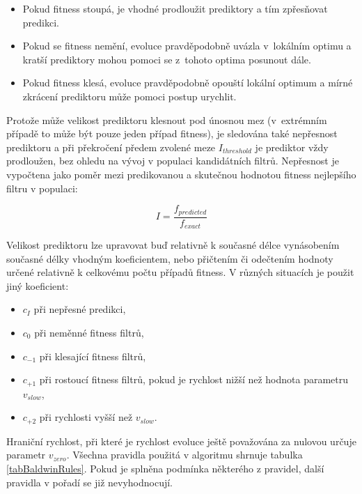 \begin{itemize}
    \item Pokud fitness stoupá, je vhodné prodloužit prediktory a tím zpřesňovat predikci.
    \item Pokud se fitness nemění, evoluce pravděpodobně uvázla v~lokálním optimu a kratší prediktory mohou pomoci se z~tohoto optima posunout dále.
    \item Pokud fitness klesá, evoluce pravděpodobně opouští lokální optimum a mírné zkrácení prediktoru může pomoci postup urychlit.
\end{itemize}

Protože může velikost prediktoru klesnout pod únosnou mez (v~extrémním případě to může být pouze jeden případ fitness), je sledována také nepřesnost prediktoru a při překročení předem zvolené meze $I_\mathit{threshold}$ je prediktor vždy prodloužen, bez ohledu na vývoj v populaci kandidátních filtrů. Nepřesnost je vypočtena jako poměr mezi predikovanou a skutečnou hodnotou fitness nejlepšího filtru v populaci:

\begin{equation}
    \mathit{I} = \frac{f_{\mathit{predicted}}}{f_{\mathit{exact}}}
\end{equation}

Velikost prediktoru lze upravovat buď relativně k současné délce vynásobením současné délky vhodným koeficientem, nebo přičtením či odečtením hodnoty určené relativně k celkovému počtu případů fitness. V různých situacích je použit jiný koeficient: %

\begin{itemize}
    \item $c_I$ při nepřesné predikci,
    \item $c_0$ při neměnné fitness filtrů,
    \item $c_{-1}$ při klesající fitness filtrů,
    \item $c_{+1}$ při rostoucí fitness filtrů, pokud je rychlost nižší než hodnota parametru $v_\mathit{slow}$,
    \item $c_{+2}$ při rychlosti vyšší než $v_\mathit{slow}$.
\end{itemize}

Hraniční rychlost, při které je rychlost evoluce ještě považována za nulovou určuje parametr $v_\mathit{zero}$. Všechna pravidla použitá v algoritmu shrnuje tabulka \ref{tabBaldwinRules}. Pokud je splněna podmínka některého z pravidel, další pravidla v pořadí se již nevyhodnocují.


